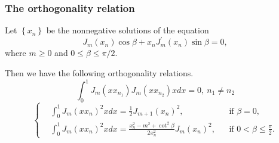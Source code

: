 \subsubsection{The orthogonality relation}
\begin{proposition}[]
Let $\left\{x_n\right\}$ be the nonnegative solutions of the equation
\begin{equation}\label{eq.Bessel_roots}
    J_m(x_n) \cos \beta+x_n J_m^{\prime}(x_n) \sin \beta=0,
\end{equation}
where $m \geq 0$ and $0 \leq \beta \leq \pi / 2$.

Then we have the following orthogonality relations.
\begin{equation}\label{eq.Bessel_orthogonality_1}
    \int_0^1 J_m\left(x x_{n_1}\right) J_m\left(x x_{n_2}\right) x d x=0,\ n_1 \neq n_2
\end{equation}
\begin{equation}\label{eq.Bessel_orthogonality_2}
    \left\{\begin{aligned}
    &\int_0^1 J_m\left(x x_n\right)^2 x d x=\frac{1}{2} J_{m+1}(x_n)^2, && \text {if } \beta=0, 
    \\
    &\int_0^1 J_m\left(x x_n\right)^2 x d x=\frac{x_n^2-m^2+\cot ^2 \beta}{2 x_n^2} J_m(x_n)^2, && \text{if } 0<\beta \leq \frac{\pi}{2} .
    \end{aligned}\right.
\end{equation}
\end{proposition}
